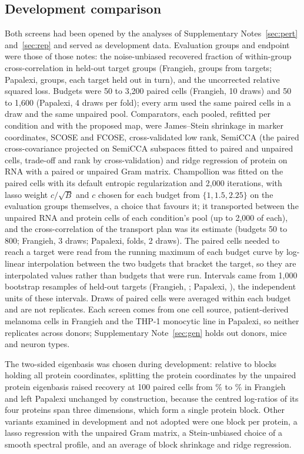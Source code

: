 \subsection*{Development comparison}
Both screens had been opened by the analyses of Supplementary Notes~\ref{sec:pert} and~\ref{sec:rep} and served as development data. Evaluation groups and endpoint were those of those notes: the noise-unbiased recovered fraction of within-group cross-correlation in held-out target groups (Frangieh, \SpFrGroups{} groups from \SpFrTargets{} targets; Papalexi, \SpPaGroups{} groups, each target held out in turn), and the uncorrected relative squared loss. Budgets were 50 to 3,200 paired cells (Frangieh, 10 draws) and 50 to 1,600 (Papalexi, 4 draws per fold); every arm used the same paired cells in a draw and the same unpaired pool. Comparators, each pooled, refitted per condition and with the proposed map, were James--Stein shrinkage in marker coordinates, SCOSE and FCOSE\cite{muandet2014,ramdas2015}, cross-validated low rank, SemiCCA\cite{kimura2013} (the paired cross-covariance projected on SemiCCA subspaces fitted to paired and unpaired cells, trade-off and rank by cross-validation) and ridge regression of protein on RNA with a paired or unpaired Gram matrix. Champollion\cite{champollion} was fitted on the paired cells with its default entropic regularization and 2,000 iterations, with lasso weight $c/\sqrt{B}$ and $c$ chosen for each budget from $\{1, 1.5, 2.25\}$ on the evaluation groups themselves, a choice that favours it; it transported between the unpaired RNA and protein cells of each condition's pool (up to 2,000 of each), and the cross-correlation of the transport plan was its estimate (budgets 50 to 800; Frangieh, 3 draws; Papalexi, \SpPaChampFolds{} folds, 2 draws). The paired cells needed to reach a target were read from the running maximum of each budget curve by log-linear interpolation between the two budgets that bracket the target, so they are interpolated values rather than budgets that were run. Intervals came from 1,000 bootstrap resamples of held-out targets (Frangieh, \SpFrTargets; Papalexi, \SpPaTargets), the independent units of these intervals. Draws of paired cells were averaged within each budget and are not replicates. Each screen comes from one cell source, patient-derived melanoma cells in Frangieh and the THP-1 monocytic line in Papalexi, so neither replicates across donors; Supplementary Note~\ref{sec:gen} holds out donors, mice and neuron types.

The two-sided eigenbasis was chosen during development: relative to blocks holding all protein coordinates, splitting the protein coordinates by the unpaired protein eigenbasis raised recovery at 100 paired cells from \SpFrOneSidedHundred\% to \SpFrRfHundred\% in Frangieh and left Papalexi unchanged by construction, because the centred log-ratios of its four proteins span three dimensions, which form a single protein block. Other variants examined in development and not adopted were one block per protein, a lasso regression with the unpaired Gram matrix, a Stein-unbiased choice of a smooth spectral profile, and an average of block shrinkage and ridge regression.

